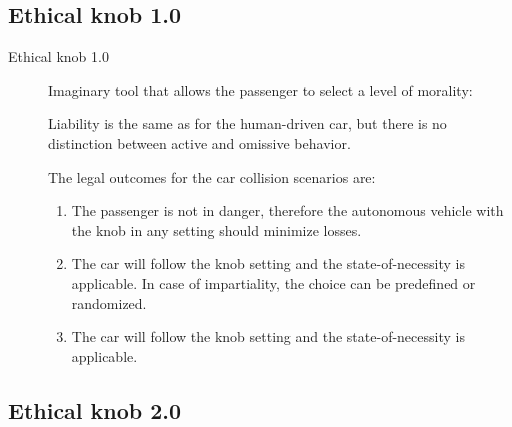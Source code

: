 \subsection{Ethical knob 1.0}

\begin{description}
    \item[Ethical knob 1.0] 
        Imaginary tool that allows the passenger to select a level of morality:

        \begin{remark}
            Liability is the same as for the human-driven car, but there is no distinction between active and omissive behavior.
        \end{remark}

        The legal outcomes for the car collision scenarios are:
        \begin{enumerate}[label=(\Alph*)]
            \item The passenger is not in danger, therefore the autonomous vehicle with the knob in any setting should minimize losses.
            \item The car will follow the knob setting and the state-of-necessity is applicable. In case of impartiality, the choice can be predefined or randomized.
            \item The car will follow the knob setting and the state-of-necessity is applicable.
        \end{enumerate}
\end{description}


\subsection{Ethical knob 2.0}

